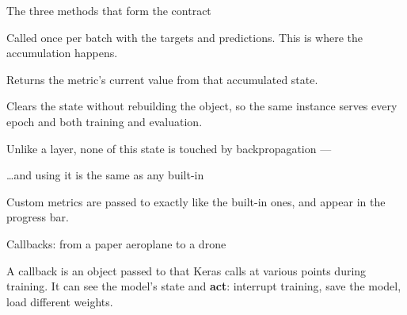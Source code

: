 \documentclass[aspectratio=169,11pt,t]{beamer}
\begin{document}
\begin{frame}[shrink=25]{The three methods that form the contract}
\begin{minipage}[t]{0.3253\textwidth}
\begin{icardaccent}
Called once per batch with the targets and predictions. This is where the accumulation happens.
\end{icardaccent}
\end{minipage}%
\hfill
\begin{minipage}[t]{0.3253\textwidth}
\begin{icardaccent}
Returns the metric's current value from that accumulated state.
\end{icardaccent}
\end{minipage}%
\hfill
\begin{minipage}[t]{0.3253\textwidth}
\begin{icardaccent}
Clears the state without rebuilding the object, so the same instance serves every epoch and both training and evaluation.
\end{icardaccent}
\end{minipage}%
\begin{iband}[signal]
Unlike a layer, none of this state is touched by backpropagation --- 
\end{iband}
\end{frame}

\begin{frame}[shrink=25]{\ldots{}and using it is the same as any built-in}
{\fontsize{9.4}{12.6}\selectfont\color{fg2}Custom metrics are passed to  exactly like the built-in ones, and appear in the progress bar.\par}\vskip 4pt
\end{frame}

\begin{frame}[shrink=25]{Callbacks: from a paper aeroplane to a drone}
\begin{iquote}
\end{iquote}
{\fontsize{9.4}{12.6}\selectfont\color{fg2}A callback is an object passed to  that Keras calls at various points during training. It can see the model's state and \textbf{act}: interrupt training, save the model, load different weights.\par}\vskip 4pt
\end{frame}
\end{document}
